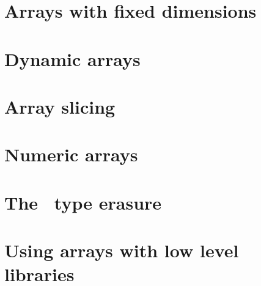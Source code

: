 \section{Arrays with fixed dimensions}


\section{Dynamic arrays}\label{sec:array:dynamic_arrays}

\section{Array slicing}\label{sec:array:array_slicing}

\section{Numeric arrays}\label{sec:array:numeric_arrays}

\section{The \arrayerasure\ type erasure}\label{sec:array:type_erasure}

\section{Using arrays with low level libraries}
